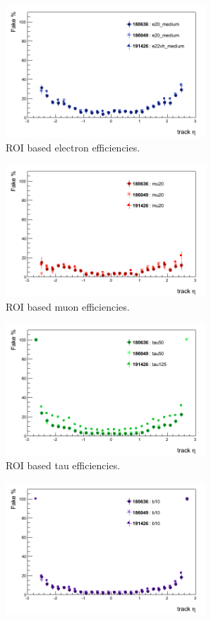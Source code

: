 \begin{figure}[htbp]
	\begin{subfigure}{.5\linewidth}
		\centering
		\includegraphics[width=75mm]{f/e20_medium_IDTrkNoCut_eta_IDS_fake}
		\caption{ROI based electron efficiencies.}
		\label{fig:trig_2011_L2_eta_a}
	\end{subfigure}
	\begin{subfigure}{.5\linewidth}	
		\centering
		\includegraphics[width=75mm]{f/mu20_IDTrkNoCut_eta_IDS_fake}
		\caption{ROI based muon efficiencies.}
		\label{fig:trig_2011_L2_eta_c}
	\end{subfigure}
	\begin{subfigure}{.5\linewidth}	
		\centering
		\includegraphics[width=75mm]{f/tau50_IDTrkNoCut_eta_SIT_fake}
		\caption{ROI based tau efficiencies.}
		\label{fig:trig_2011_L2_eta_e}
	\end{subfigure}
	\begin{subfigure}{.5\linewidth}	
		\centering
		\includegraphics[width=75mm]{f/b10_IDTrkNoCut_eta_SIT_fake}

\end{subfigure}
\end{figure}
